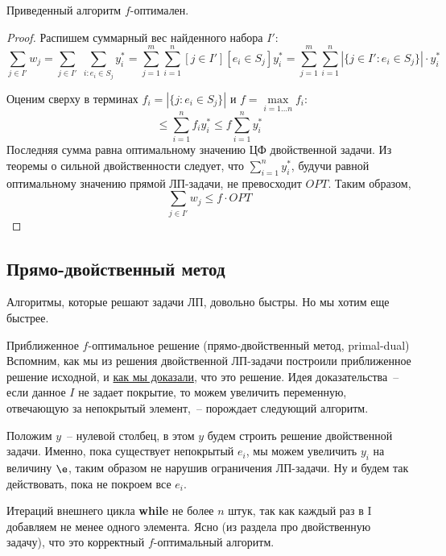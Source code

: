 \begin{theorem*}
    Приведенный алгоритм $f$-оптимален.
\end{theorem*}
\begin{proof}
    Распишем суммарный вес найденного набора $I'$:
	$$\sum_{j\in I'} w_j = \sum_{j\in I'} \; \sum_{i: e_i \in S_j} y_i^* = \sum_{j=1}^m\sum_{i=1}^n [j \in I'] [e_i \in S_j] y_i^* = \sum_{j=1}^m \sum_{i=1}^n\left|\{j \in I': e_i \in S_j\}\right|\cdot y_i^*$$

    Оценим сверху в терминах $f_i = \left|\{j: e_i \in S_j\}\right|$ и $f = \max\limits_{i=1\ldots n} f_i$:
    $$ \leq \sum_{i=1}^nf_iy_i^* \leq f\sum_{i=1}^n y_i^*$$
    Последняя сумма равна оптимальному значению ЦФ двойственной задачи. Из теоремы о сильной двойственности следует, что $\sum\limits_{i=1}^n y_i^*$, будучи равной оптимальному значению прямой ЛП-задачи, не превосходит $OPT$. Таким образом, $$\sum_{j\in I'} w_j \leq f\cdot OPT$$
\end{proof}

\subsection{Прямо-двойственный метод}

Алгоритмы, которые решают задачи ЛП, довольно быстры. Но мы хотим еще быстрее.

\begin{algodescription}{Приближенное $f$-оптимальное решение (прямо-двойственный метод, primal-dual)}
    Вспомним, как мы из решения двойственной ЛП-задачи построили приближенное решение исходной, и \underline{как мы доказали}, что это решение. Идея доказательства~-- если данное $I$ не задает покрытие, то можем увеличить переменную, отвечающую за непокрытый элемент,~-- порождает следующий алгоритм.

    Положим $y$~-- нулевой столбец, в этом $y$ будем строить решение двойственной задачи. Именно, пока существует непокрытый $e_i$, мы можем увеличить $y_i$ на величину $\e$, таким образом не нарушив ограничения ЛП-задачи. Ну и будем так действовать, пока не покроем все $e_i$.

    \begin{algorithm}
    	\DontPrintSemicolon
    \end{algorithm}

    Итераций внешнего цикла \textbf{while} не более $n$ штук, так как каждый раз в I добавляем не менее одного элемента. Ясно (из раздела про двойственную задачу), что это корректный $f$-оптимальный алгоритм.
\end{algodescription}
